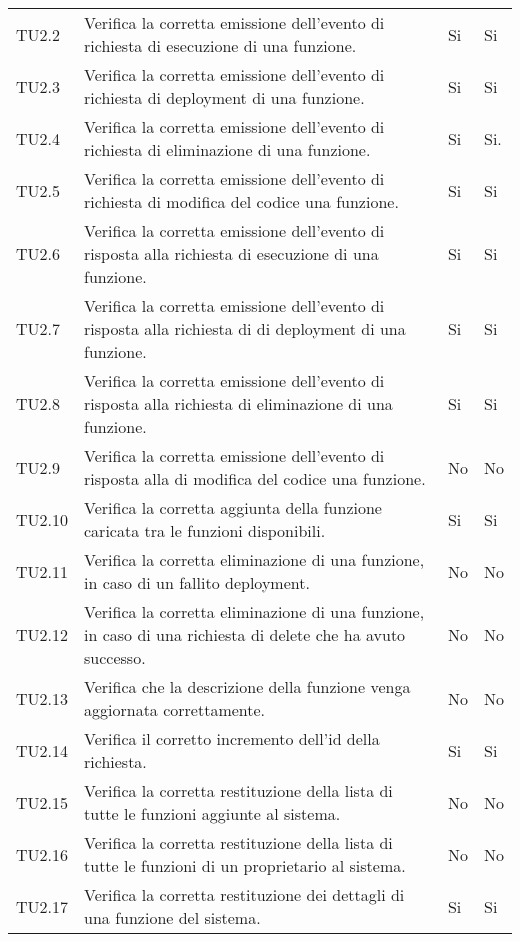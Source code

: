 \begin{longtable}{
		>{\centering}p{}
		>{}p{}
		>{\centering}p{}
		>{\centering}p{} }
TU2.2   &  Verifica la corretta emissione dell'evento di richiesta di esecuzione di una funzione. &
Si & Si \tabularnewline

TU2.3   &  Verifica la corretta emissione dell'evento di richiesta di deployment di una funzione. &
Si & Si \tabularnewline

TU2.4   &  Verifica la corretta emissione dell'evento di richiesta di eliminazione di una funzione. &
Si & Si. \tabularnewline

TU2.5   &  Verifica la corretta emissione dell'evento di richiesta di modifica del codice una funzione. &
Si & Si \tabularnewline

TU2.6   &  Verifica la corretta emissione dell'evento di risposta alla richiesta di esecuzione di una funzione. &
Si & Si \tabularnewline

TU2.7   &  Verifica la corretta emissione dell'evento di risposta alla richiesta di di deployment di una funzione. &
Si & Si \tabularnewline

TU2.8   &  Verifica la corretta emissione dell'evento di risposta alla richiesta di eliminazione di una funzione. &
Si & Si \tabularnewline

TU2.9   &  Verifica la corretta emissione dell'evento di risposta alla di modifica del codice una funzione. &
No & No \tabularnewline

TU2.10  &  Verifica la corretta aggiunta della funzione caricata tra le funzioni disponibili. &
Si & Si \tabularnewline

TU2.11  &  Verifica la corretta eliminazione di una funzione, in caso di un fallito deployment. &
No & No \tabularnewline

TU2.12  &  Verifica la corretta eliminazione di una funzione, in caso di una richiesta di delete che ha avuto successo. &
No & No \tabularnewline

TU2.13  &  Verifica che la descrizione della funzione venga aggiornata correttamente. &
No & No \tabularnewline

TU2.14  &  Verifica il corretto incremento dell'id della richiesta. &
Si & Si \tabularnewline

TU2.15  &  Verifica la corretta restituzione della lista di tutte le funzioni aggiunte al sistema. &
No & No \tabularnewline

TU2.16  &  Verifica la corretta restituzione della lista di tutte le funzioni di un proprietario al sistema. &
No & No \tabularnewline

TU2.17  &  Verifica la corretta restituzione dei dettagli di una funzione del sistema. &
Si & Si \tabularnewline


\end{longtable}
